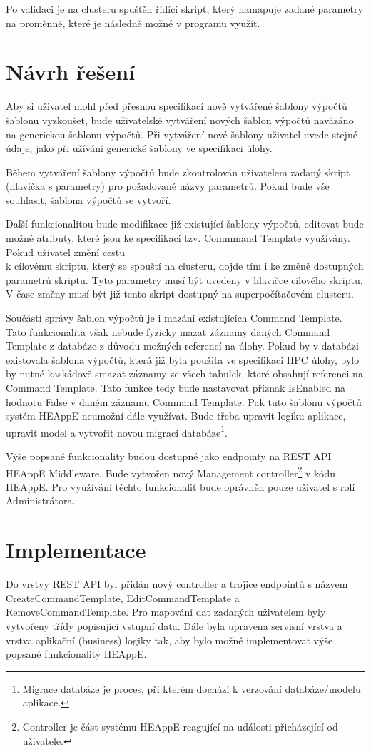 Po validaci je na clusteru spuštěn řídící skript, který namapuje zadané parametry na proměnné, které je následně možné v programu využít.

\section{Návrh řešení}
Aby si uživatel mohl před přesnou specifikací nově vytvářené šablony výpočtů šablonu vyzkoušet, bude uživatelské vytváření nových šablon výpočtů navázáno na generickou šablonu výpočtů. Při vytváření nové šablony uživatel uvede stejné údaje, jako při užívání generické šablony ve specifikaci úlohy.

Během vytváření šablony výpočtů bude zkontrolován uživatelem zadaný skript (hlavička s parametry) pro požadované názvy parametrů. Pokud bude vše souhlasit, šablona výpočtů se vytvoří.

Další funkcionalitou bude modifikace již existující šablony výpočtů, editovat bude možné atributy, které jsou ke specifikaci tzv. Commmand Template využívány. Pokud uživatel změní cestu \\k cílovému skriptu, který se spouští na clusteru, dojde tím i ke změně dostupných parametrů skriptu. Tyto parametry musí být uvedeny v hlavičce cílového skriptu. V čase změny musí být již tento skript dostupný na superpočítačovém clusteru.

Součástí správy šablon výpočtů je i mazání existujících Command Template. Tato funkcionalita však nebude fyzicky mazat záznamy daných Command Template z databáze z důvodu možných referencí na úlohy. Pokud by v databázi existovala šablona výpočtů, která již byla použita ve specifikaci HPC úlohy, bylo by nutné kaskádově smazat záznamy ze všech tabulek, které obsahují referenci na Command Template. Tato funkce tedy bude nastavovat příznak IsEnabled na hodnotu False v daném záznamu Command Template. Pak tuto šablonu výpočtů systém HEAppE neumožní dále využívat. Bude třeba upravit logiku aplikace, upravit model a vytvořit novou migraci databáze\footnote{Migrace databáze je proces, při kterém dochází k verzování databáze/modelu aplikace.}.  

Výše popsané funkcionality budou dostupné jako endpointy na REST API HEAppE Middleware. Bude vytvořen nový Management controller\footnote{Controller je část systému HEAppE reagující na události přicházející od uživatele.} v kódu HEAppE. Pro využívání těchto funkcionalit bude oprávněn pouze uživatel s rolí Administrátora.

\section{Implementace}
Do vrstvy REST API byl přidán nový controller a trojice endpointů s názvem CreateCommandTemplate, EditCommandTemplate a RemoveCommandTemplate. Pro mapování dat zadaných uživatelem byly vytvořeny třídy popisující vstupní data. Dále byla upravena servisní vrstva a vrstva aplikační (business) logiky tak, aby bylo možné implementovat výše popsané funkcionality HEAppE. 

